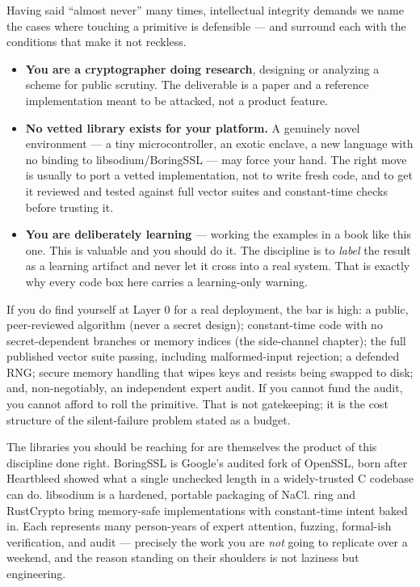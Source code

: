Having said ``almost never'' many times, intellectual integrity demands we name the
cases where touching a primitive is defensible --- and surround each with the
conditions that make it not reckless.

\begin{itemize}
  \item \textbf{You are a cryptographer doing research}, designing or analyzing a
  scheme for public scrutiny. The deliverable is a paper and a reference
  implementation meant to be attacked, not a product feature.
  \item \textbf{No vetted library exists for your platform.} A genuinely novel
  environment --- a tiny microcontroller, an exotic enclave, a new language with no
  binding to libsodium/BoringSSL --- may force your hand. The right move is usually
  to port a vetted implementation, not to write fresh code, and to get it reviewed
  and tested against full vector suites and constant-time checks before trusting it.
  \item \textbf{You are deliberately learning} --- working the examples in a book
  like this one. This is valuable and you should do it. The discipline is to
  \emph{label} the result as a learning artifact and never let it cross into a real
  system. That is exactly why every code box here carries a learning-only warning.
\end{itemize}

If you do find yourself at Layer 0 for a real deployment, the bar is high: a
public, peer-reviewed algorithm (never a secret design); constant-time code with
no secret-dependent branches or memory indices (the side-channel chapter); the full
published vector suite passing, including malformed-input rejection; a defended
RNG; secure memory handling that wipes keys and resists being swapped to disk; and,
non-negotiably, an independent expert audit. If you cannot fund the audit, you
cannot afford to roll the primitive. That is not gatekeeping; it is the cost
structure of the silent-failure problem stated as a budget.

\begin{historybox}
The libraries you should be reaching for are themselves the product of this
discipline done right. BoringSSL is Google's audited fork of OpenSSL, born after
Heartbleed showed what a single unchecked length in a widely-trusted C codebase can
do. libsodium is a hardened, portable packaging of NaCl. ring and RustCrypto bring
memory-safe implementations with constant-time intent baked in. Each represents
many person-years of expert attention, fuzzing, formal-ish verification, and audit
--- precisely the work you are \emph{not} going to replicate over a weekend, and the
reason standing on their shoulders is not laziness but engineering.
\end{historybox}

